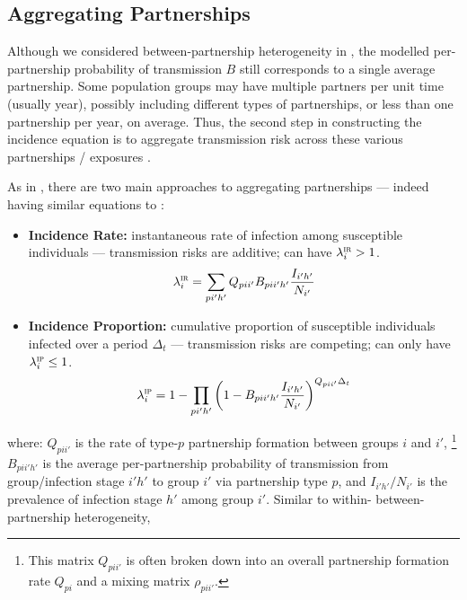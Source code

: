 \subsection{Aggregating Partnerships}\label{foi.prior.ptr}
Although we considered between-partnership heterogeneity in ,
the modelled per-partnership probability of transmission $B$
still corresponds to a single average partnership.
Some population groups may have multiple partners per unit time (usually year),
possibly including different types of partnerships,
or less than one partnership per year, on average.
Thus, the second step in constructing the incidence equation is to
aggregate transmission risk across these various partnerships / exposures \cite{Allard1990}.
\par
As in , there are two main approaches to aggregating partnerships
--- indeed having similar equations to :
\begin{itemize}
  \item \textbf{Incidence Rate:}
  instantaneous rate of infection among susceptible individuals
  --- transmission risks are additive; can have $\lambda_i^\textsc{ir} > 1$.
  \begin{equation}\label{eq:foi.ir}
    \lambda_i^\textsc{ir} = \sum_{pi'h'} Q_{pii'} B_{pii'h'} \frac{{I}_{i'h'}}{N_{i'}}
  \end{equation}
  \item \textbf{Incidence Proportion:}
  cumulative proportion of susceptible individuals infected over a period $\Delta_t$
  --- transmission risks are competing; can only have $\lambda_i^\textsc{ip} \le 1$.
  \begin{equation}\label{eq:foi.ip}
    \lambda_i^\textsc{ip} = 1 - \prod_{pi'h'} {\left(1 - B_{pii'h'} \frac{{I}_{i'h'}}{N_{i'}}\right)}^{Q_{pii'} \Delta_t}
  \end{equation}
\end{itemize} where:
$Q_{pii'}$ is the rate of type-$p$ partnership formation between groups $i$ and $i'$,%
\footnote{This matrix $Q_{pii'}$ is often broken down into
  an overall partnership formation rate $Q_{pi}$ and a mixing matrix $\rho_{pii'}$.}
$B_{pii'h'}$ is the average per-partnership probability of transmission
from group/infection stage $i'h'$ to group $i'$ via partnership type $p$,
and $I_{i'h'}/N_{i'}$ is the prevalence of infection stage $h'$ among group $i'$.
Similar to within- \vs between-partnership heterogeneity,
